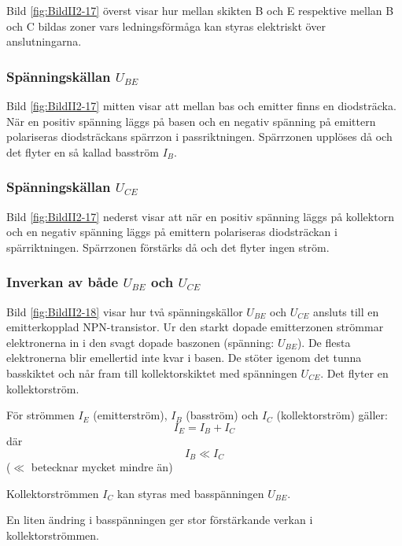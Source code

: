Bild \ref{fig:BildII2-17} överst visar hur mellan skikten B och E
respektive mellan B och C bildas zoner vars ledningsförmåga kan styras
elektriskt över anslutningarna.

\subsubsection{Spänningskällan \(U_{BE}\)}

Bild \ref{fig:BildII2-17} mitten visar att mellan bas och emitter
finns en diodsträcka. När en positiv spänning läggs på basen och en
negativ spänning på emittern polariseras diodsträckans spärrzon i
passriktningen. Spärrzonen upplöses då och det flyter en så kallad
basström \(I_B\).

\subsubsection{Spänningskällan \(U_{CE}\)}

Bild \ref{fig:BildII2-17} nederst visar att när en positiv spänning
läggs på kollektorn och en negativ spänning läggs på emittern
polariseras diodsträckan i spärriktningen. Spärrzonen förstärks då och
det flyter ingen ström.

\subsubsection{Inverkan av både \(U_{BE}\) och \(U_{CE}\)}

Bild \ref{fig:BildII2-18} visar hur två spänningskällor \(U_{BE}\) och
\(U_{CE}\) ansluts till en emitterkopplad NPN-transistor. Ur den
starkt dopade emitterzonen strömmar elektronerna in i den svagt dopade
baszonen (spänning: \(U_{BE}\)). De flesta elektronerna blir
emellertid inte kvar i basen. De stöter igenom det tunna basskiktet
och når fram till kollektorskiktet med spänningen \(U_{CE}\). Det
flyter en kollektorström.

För strömmen \(I_E\) (emitterström), \(I_B\) (basström) och \(I_C\)
(kollektorström) gäller:
\[   I_E = I_B + I_C   \]
där
\[   I_B \ll I_C   \]
(\(\ll\) betecknar mycket mindre än)

Kollektorströmmen \(I_C\) kan styras med basspänningen \(U_{BE}\).

En liten ändring i basspänningen ger stor förstärkande verkan i
kollektorströmmen.

